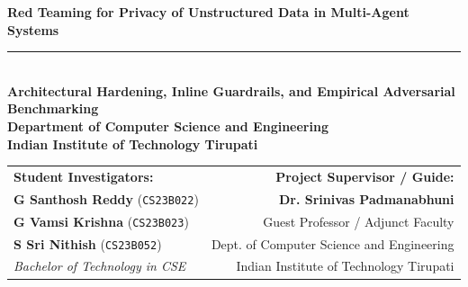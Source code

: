 \documentclass[11pt,a4paper]{article}
\begin{document}

\thispagestyle{empty}
\begin{center}
    \vspace*{2.5cm}
    {\Huge \textbf{\color{primarynavy}Red Teaming for Privacy of Unstructured Data in Multi-Agent Systems}} \\[1.5em]
    \textcolor{primarynavy}{\rule{0.6\textwidth}{1.2pt}} \\[1.5em]
    {\LARGE \textbf{\color{darkslate}Architectural Hardening, Inline Guardrails, and Empirical Adversarial Benchmarking}} \\[3.5em]

    {\Large \textbf{Department of Computer Science and Engineering}} \\[0.4em]
    {\Large \textbf{Indian Institute of Technology Tirupati}} \\[4em]

    \begin{tabularx}{0.95\textwidth}{X r}
        \textbf{\large Student Investigators:} & \textbf{\large Project Supervisor / Guide:} \\[0.8em]
        \textbf{G Santhosh Reddy} (\texttt{CS23B022}) & \textbf{Dr. Srinivas Padmanabhuni} \\[0.3em]
        \textbf{G Vamsi Krishna} (\texttt{CS23B023})  & Guest Professor / Adjunct Faculty \\[0.3em]
        \textbf{S Sri Nithish} (\texttt{CS23B052})    & Dept. of Computer Science and Engineering \\[0.3em]
        \textit{Bachelor of Technology in CSE}        & Indian Institute of Technology Tirupati \\
    \end{tabularx}
\end{center}

\clearpage
\end{document}
